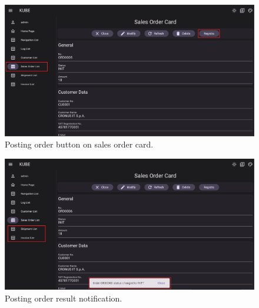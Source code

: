\begin{figure}
    \centering
    \includegraphics[scale=0.4]{Pictures/5_order1.png}
    \caption{Posting order button on sales order card.}
    \label{fig:5_order1}
\end{figure}

\begin{figure}
    \centering
    \includegraphics[scale=0.4]{Pictures/5_order2.png}
    \caption{Posting order result notification.}
    \label{fig:5_order2}
\end{figure}
